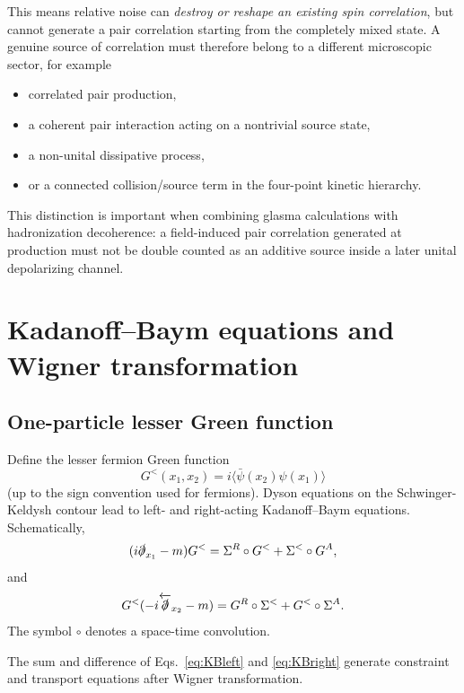 \documentclass[11pt]{article}
\begin{document}
This means relative noise can \emph{destroy or reshape an existing spin correlation}, but cannot generate a pair correlation starting from the completely mixed state. A genuine source of correlation must therefore belong to a different microscopic sector, for example

\begin{itemize}[leftmargin=1.5em]
\item correlated pair production,
\item a coherent pair interaction acting on a nontrivial source state,
\item a non-unital dissipative process,
\item or a connected collision/source term in the four-point kinetic hierarchy.
\end{itemize}

This distinction is important when combining glasma calculations with hadronization decoherence: a field-induced pair correlation generated at production must not be double counted as an additive source inside a later unital depolarizing channel.

\section{Kadanoff--Baym equations and Wigner transformation}

\subsection{One-particle lesser Green function}

Define the lesser fermion Green function
\begin{equation}
G^<(x_1,x_2)
=i\langle\bar\psi(x_2)\psi(x_1)\rangle
\end{equation}
(up to the sign convention used for fermions). Dyson equations on the Schwinger-Keldysh contour lead to left- and right-acting Kadanoff--Baym equations. Schematically,
\begin{equation}
(i\slashed\partial_{x_1}-m)G^<
=\Sigma^R\circ G^<+\Sigma^<\circ G^A,
\label{eq:KBleft}
\end{equation}
and
\begin{equation}
G^<(-i\overleftarrow{\slashed\partial}_{x_2}-m)
=G^R\circ\Sigma^<+G^<\circ\Sigma^A.
\label{eq:KBright}
\end{equation}
The symbol $\circ$ denotes a space-time convolution.

The sum and difference of Eqs.~\eqref{eq:KBleft} and \eqref{eq:KBright} generate constraint and transport equations after Wigner transformation.
\end{document}
